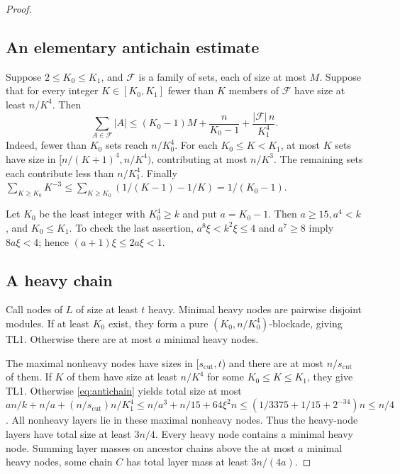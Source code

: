 \documentclass[11pt,a4paper]{article}
\theoremstyle{definition}
\theoremstyle{remark}
\numberwithin{equation}{section}
\begin{document}
\begin{proof}
\subsection{An elementary antichain estimate}
Suppose \(2\le K_{0}\le K_{1}\), and \(\mathcal F\) is a family of sets, each of size at most \(M\). Suppose that for every integer \(K\in[K_{0},K_{1}]\) fewer than \(K\) members of \(\mathcal F\) have size at least \(n/K^{4}\). Then
\begin{equation}\label{eq:antichain}
 \sum_{A\in\mathcal F}|A|\le (K_{0}-1)M+\frac{n}{K_{0}-1}+\frac{|\mathcal F|\,n}{K_{1}^{4}}.
\end{equation}
Indeed, fewer than \(K_{0}\) sets reach \(n/K_{0}^{4}\). For each \(K_{0}\le K<K_{1}\), at most \(K\) sets have size in \([n/(K+1)^{4},n/K^{4})\), contributing at most \(n/K^{3}\). The remaining sets each contribute less than \(n/K_{1}^{4}\). Finally \(\sum _{K\ge K_{0}}K^{-3}\le \sum _{K\ge K_{0}}(1/(K-1)-1/K)=1/(K_{0}-1)\).

Let \(K_{0}\) be the least integer with \(K_{0}^{4}\ge\allowbreak k\) and put \(a=K_{0}-1\). Then \(a\ge\allowbreak 15,\allowbreak  a^{4}<k\), and \(K_{0}\le\allowbreak K_{1}\). To check the last assertion, \(a^{8} \xi<k^{2} \xi\le\allowbreak 4\) and \(a^{7}\ge\allowbreak 8\) imply \(8a \xi<4\); hence \((a+1)\xi\le\allowbreak 2a \xi<1\).
\subsection{A heavy chain}
Call nodes of \(L\) of size at least \(t\) heavy. Minimal heavy nodes are pairwise disjoint modules. If at least \(K_{0}\) exist, they form a pure \((K_{0},\allowbreak n/K_{0}^{4})\)-blockade, giving TL1. Otherwise there are at most \(a\) minimal heavy nodes.

The maximal nonheavy nodes have sizes in [\(s_{\mathrm{cut}},\allowbreak t\)) and there are at most \(n/s_{\mathrm{cut}}\) of them. If \(K\) of them have size at least \(n/K^{4}\) for some \(K_{0}\le\allowbreak K\le\allowbreak K_{1}\), they give TL1. Otherwise \eqref{eq:antichain} yields total size at most \(an/k+n/a+(n/s_{\mathrm{cut}})n/K_{1}^{4} \le\allowbreak n/a^{3}+n/15+64\xi^{2} n \le\allowbreak (1/3375+1/15+2^{-34})n\le\allowbreak n/4\). All nonheavy layers lie in these maximal nonheavy nodes. Thus the heavy-node layers have total size at least \(3n/4\). Every heavy node contains a minimal heavy node. Summing layer masses on ancestor chains above the at most \(a\) minimal heavy nodes, some chain \(C\) has total layer mass at least \(3n/(4a)\).

\end{proof}
\end{document}
